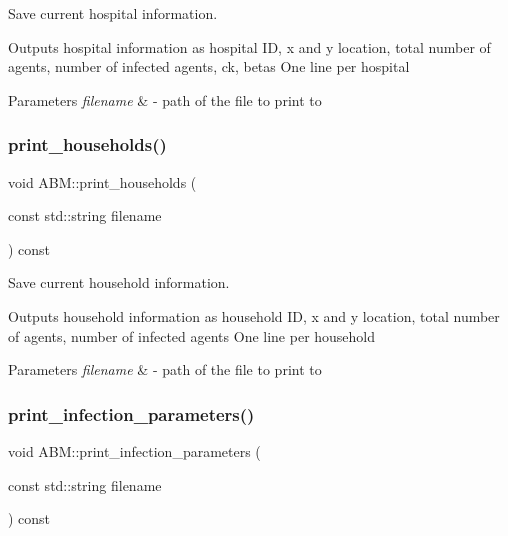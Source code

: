 Save current hospital information. 

Outputs hospital information as hospital ID, x and y location, total number of agents, number of infected agents, ck, betas One line per hospital 
\begin{DoxyParams}{Parameters}
{\em filename} & -\/ path of the file to print to \\
\hline
\end{DoxyParams}
\mbox{\label{classABM_a5d0d2b32a368c082d8217f2d3a22b832}} 
\subsubsection{\texorpdfstring{print\+\_\+households()}{print\_households()}}
{\footnotesize\ttfamily void A\+B\+M\+::print\+\_\+households (\begin{DoxyParamCaption}\item[{const std\+::string}]{filename }\end{DoxyParamCaption}) const}



Save current household information. 

Outputs household information as household ID, x and y location, total number of agents, number of infected agents One line per household 
\begin{DoxyParams}{Parameters}
{\em filename} & -\/ path of the file to print to \\
\hline
\end{DoxyParams}
\mbox{\label{classABM_a41144391129c6ba85305ccceff148e20}} 
\subsubsection{\texorpdfstring{print\+\_\+infection\+\_\+parameters()}{print\_infection\_parameters()}}
{\footnotesize\ttfamily void A\+B\+M\+::print\+\_\+infection\+\_\+parameters (\begin{DoxyParamCaption}\item[{const std\+::string}]{filename }\end{DoxyParamCaption}) const}



